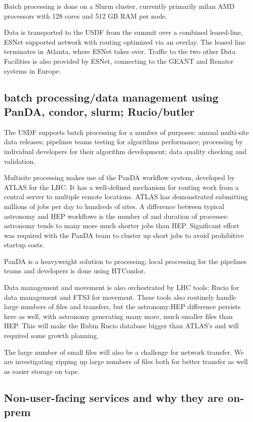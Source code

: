 Batch processing is done on a Slurm cluster, currently primarily milan AMD
processors with 128 cores and 512 GB RAM per node.

Data is transported to the USDF from the summit over a combined
leased-line, ESNet supported network with routing optimized via an
overlay. The leased line terminates in Atlanta, where ESNet takes
over. Traffic to the two other Data Facilities is also provided by
ESNet, connecting to the GEANT and Renater systems in Europe.

\subsection{batch processing/data management using PanDA, condor,
  slurm; Rucio/butler}

The USDF supports batch processing for a number of purposes: annual
multi-site data releases; pipelines teams testing for algorithms
performance; processing by individual developers for their algorithm
development; data quality checking and validation.

Multisite processing makes use of the PanDA workflow system, developed
by ATLAS for the LHC. It has a well-defined mechanism for routing work
from a central server to multiple remote locations. ATLAS has
demonstrated submitting millions of jobs per day to hundreds of
sites. A difference between typical astronomy and HEP workflows is the
number of and duration of processes: astronomy tends to many more much
shorter jobs than HEP. Significant effort was required with the PanDA
team to cluster up short jobs to avoid prohibitive startup costs.

PanDA is a heavyweight solution to processing; local processing for
the pipelines teams and developers is done using HTCondor.

Data management and movement is also orchestrated by LHC tools: Rucio
for data management and FTS3 for movement. These tools also routinely
handle large numbers of files and transfers, but the astronomy:HEP
difference persists here as well, with astronomy generating many more,
much smaller files than HEP. This will make the Rubin Rucio database
bigger than ATLAS's and will required some growth planning.

The large number of small files will also be a challenge for network
transfer. We are investigating zipping up large numbers of files both
for better transfer as well as easier storage on tape.

\subsection{Non-user-facing services and why they are on-prem}

